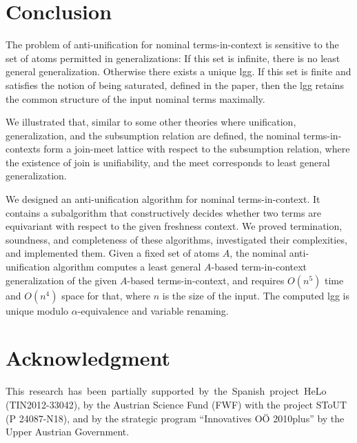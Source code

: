 \documentclass{llncs}
\begin{document}
\section{Conclusion}
\label{sect:conclusion}

The problem of anti-unification for nominal terms-in-context is
sensitive to the set of atoms permitted in generalizations: If this
set is infinite, there is no least general generalization. Otherwise
there exists a unique lgg. If this set is finite and satisfies the
notion of being saturated, defined in the paper, then the lgg retains
the common structure of the input nominal terms maximally.

We illustrated that, similar to some other theories where unification,
generalization, and the subsumption relation are defined, the nominal
terms-in-contexts form a join-meet lattice with respect to the
subsumption relation, where the existence of join is unifiability, and
the meet corresponds to least general generalization.

We designed an anti-unification algorithm for nominal
terms-in-context. It contains a subalgorithm that constructively
decides whether two terms are equivariant with respect to the given
freshness context. We proved termination, soundness, and completeness
of these algorithms, investigated their complexities, and implemented
them. Given a fixed set of atoms $A$, the nominal anti-unification
algorithm computes a least general $A$-based term-in-context
generalization of the given $A$-based terms-in-context, and requires
$O(n^5)$ time and $O(n^4)$ space for that, where $n$ is the size of
the input. The computed lgg is unique modulo $\alpha$-equivalence and
variable renaming.




\section*{Acknowledgment}

This\, research\, has\, been\, partially\, supported\, by\, the\, Spanish\, project\, HeLo
(TIN2012-33042), by the Austrian
Science Fund (FWF) with the project SToUT (P 24087-N18), and by the strategic program ``Innovatives O\"{O} 2010plus'' by the Upper Austrian Government.



\end{document}
